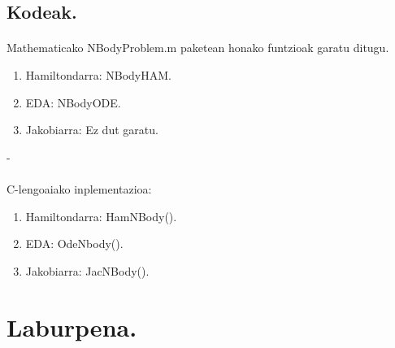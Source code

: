                  
\subsection{Kodeak.}

\paragraph*{} Mathematicako NBodyProblem.m paketean honako funtzioak garatu ditugu.

\begin{enumerate}
   \item Hamiltondarra: NBodyHAM.
   \item EDA: NBodyODE.
   \item Jakobiarra: Ez dut garatu.
\end{enumerate}

-\paragraph*{} C-lengoaiako inplementazioa:

\begin{enumerate}
   \item Hamiltondarra: HamNBody().
   \item EDA: OdeNbody().
   \item Jakobiarra: JacNBody().
\end{enumerate}

\section{Laburpena.}
